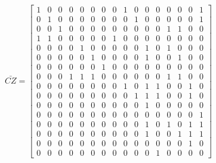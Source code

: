 \documentclass[12pt, a4paper]{report}
\begin{document}
\begin{appendices}
\begin{equation}
\label{mat:Logical CZ}
\bar{CZ}=
    \begin{bmatrix}
    1 & 0 & 0 & 0 & 0 & 0 & 0 & 0 & 1 & 0 & 0 & 0 & 0 & 0 & 0 & 1 \\
    0 & 1 & 0 & 0 & 0 & 0 & 0 & 0 & 0 & 1 & 0 & 0 & 0 & 0 & 0 & 1 \\
    0 & 0 & 1 & 0 & 0 & 0 & 0 & 0 & 0 & 0 & 0 & 0 & 1 & 1 & 0 & 0 \\
    1 & 1 & 0 & 0 & 0 & 0 & 0 & 1 & 0 & 0 & 0 & 0 & 0 & 0 & 0 & 0 \\
    0 & 0 & 0 & 0 & 1 & 0 & 0 & 0 & 0 & 0 & 1 & 0 & 1 & 0 & 0 & 0 \\
    0 & 0 & 0 & 0 & 0 & 1 & 0 & 0 & 0 & 0 & 1 & 0 & 0 & 1 & 0 & 0 \\
    0 & 0 & 0 & 0 & 0 & 0 & 1 & 0 & 0 & 0 & 0 & 0 & 0 & 0 & 0 & 0 \\
    0 & 0 & 0 & 1 & 1 & 1 & 0 & 0 & 0 & 0 & 0 & 0 & 1 & 1 & 0 & 0 \\
    0 & 0 & 0 & 0 & 0 & 0 & 0 & 0 & 1 & 0 & 1 & 1 & 0 & 0 & 1 & 0 \\
    0 & 0 & 0 & 0 & 0 & 0 & 0 & 0 & 0 & 1 & 1 & 1 & 0 & 0 & 1 & 0 \\
    0 & 0 & 0 & 0 & 0 & 0 & 0 & 0 & 0 & 0 & 1 & 0 & 0 & 0 & 0 & 0 \\
    0 & 0 & 0 & 0 & 0 & 0 & 0 & 0 & 0 & 0 & 0 & 0 & 0 & 0 & 0 & 1 \\
    0 & 0 & 0 & 0 & 0 & 0 & 0 & 0 & 0 & 0 & 1 & 0 & 1 & 0 & 1 & 1 \\
    0 & 0 & 0 & 0 & 0 & 0 & 0 & 0 & 0 & 0 & 1 & 0 & 0 & 1 & 1 & 1 \\
    0 & 0 & 0 & 0 & 0 & 0 & 0 & 0 & 0 & 0 & 0 & 0 & 0 & 0 & 1 & 0 \\
    0 & 0 & 0 & 0 & 0 & 0 & 0 & 0 & 0 & 0 & 0 & 1 & 0 & 0 & 0 & 0
    \end{bmatrix}
\end{equation}


\end{appendices}
\end{document}
